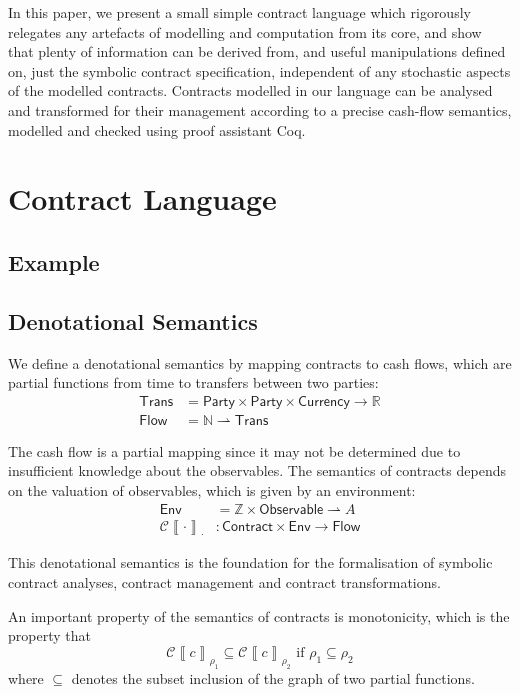 \documentclass[a4paper,debug,twocolumn]{easychair}
\newcommand\type[1]{\mathsf{#1}}
\newcommand\reals{{\mathbb R}}
\newcommand\nats{{\mathbb N}}
\newcommand\ints{{\mathbb Z}}
\newcommand\pto{\rightharpoonup}
\newcommand\cSem[2]{{\mathcal C}\left\llbracket#1\right\rrbracket_{#2}}
\theoremstyle{plain}
\begin{document}
In this paper, we present a small simple contract language which rigorously
relegates any artefacts of modelling and computation from its core, and show
that plenty of information can be derived from, and useful manipulations defined
on, just the symbolic contract specification, independent of any stochastic
aspects of the modelled contracts.
Contracts modelled in our language can be analysed and transformed for their
management according to a precise cash-flow semantics, modelled and checked
using proof assistant Coq.

\section{Contract Language}
\label{sec:contract-language}

\subsection{Example}
\label{sec:example}

\subsection{Denotational Semantics}
\label{sec:semantics}

We define a denotational semantics by mapping contracts to cash flows,
which are partial functions from time to transfers between two
parties:
\begin{align*}
  \type{Trans} &= \type{Party} \times \type{Party} \times
  \type{Currency} \to \reals\\
  \type{Flow} &= \nats \pto \type{Trans}
\end{align*}

The cash flow is a partial mapping since it may not be determined due
to insufficient knowledge about the observables. The semantics of
contracts depends on the valuation of observables, which is given by
an environment:
\begin{align*}
  \type{Env} &= \ints \times \type{Observable} \pto A\\
  \cSem{\cdot}{\cdot}&\colon \type{Contract} \times \type{Env} \to
  \type{Flow}
\end{align*}

This denotational semantics is the foundation for the formalisation of
symbolic contract analyses, contract management and contract
transformations.

An important property of the semantics of contracts is monotonicity,
which is the property that
\[
\cSem c {\rho_1} \subseteq \cSem c {\rho_2} \text{ if }
\rho_1\subseteq \rho_2
\]
where $\subseteq$ denotes the subset inclusion of the graph of two
partial functions.
\end{document}
